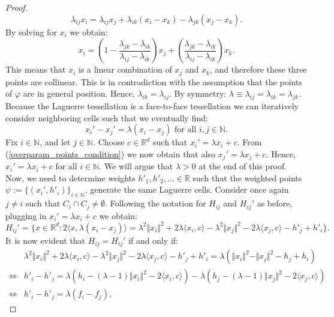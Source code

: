 \documentclass{article}
\newcommand{\NN}{\mathbb{N}}
\newcommand{\RR}{\mathbb{R}}
\theoremstyle{plain}
\theoremstyle{remark}
\theoremstyle{definition}
\begin{document}
\begin{proof}
    \[\lambda_{ij}x_i = \lambda_{ij}x_j + \lambda_{ik}(x_i - x_k) - \lambda_{jk}(x_j - x_k).\]
    By solving for $x_i$ we obtain:
    \[x_i = \left(1 - \frac{\lambda_{jk} - \lambda_{ik}}{\lambda_{ij} - \lambda_{ik}}\right)x_j + \left( \frac{\lambda_{jk} - \lambda_{ik}}{\lambda_{ij} - \lambda_{ik}}\right)x_k.\]
    This means that $x_i$ is a linear combination of $x_j$ and $x_k$, and therefore these three points are collinear. This is in contradiction with the assumption that the points of $\varphi$ are in general position. Hence, $\lambda_{ik} = \lambda_{ij}$. By symmetry: $\lambda \equiv \lambda_{ij} = \lambda_{ik} = \lambda_{jk}$. Because the Laguerre tessellation is a face-to-face tessellation we can iteratively consider neighboring cells such that we eventually find:
    \begin{equation}
        x_i' - x_j' = \lambda(x_i - x_j) \text{  for all } i,j \in \NN. \label{overparam_points_condition}
    \end{equation}
    Fix $i \in \NN$, and let $j \in \NN$. Choose $c \in \RR^d$ such that $x_i' = \lambda x_i + c$. From (\ref{overparam_points_condition}) we now obtain that also $x_j' = \lambda x_j + c$. Hence, $x_i' = \lambda x_i + c$ for all $i \in \NN$. We will argue that $\lambda > 0$ at the end of this proof. Now, we need to determine weights $h'_1, h'_2,\dots \in \RR$ such that the weighted points $\psi := \{(x_i',h'_i)\}_{i \in \NN}$. generate the same Laguerre cells. Consider once again $j\neq i$ such that $C_i \cap C_j \neq \emptyset$. Following the notation for $H_{ij}$ and $H_{ij}'$ as before, plugging in $x_i' = \lambda x_i + c$ we obtain:
    \[H_{ij}' = \{x \in \RR^d: 2 \langle x, \lambda(x_i - x_j)\rangle = \lambda^2 \Vert x_i \Vert^2 + 2\lambda \langle x_i, c\rangle - \lambda^2 \Vert x_j \Vert^2 - 2\lambda \langle x_j, c\rangle - h'_j + h'_i\}.\]
    It is now evident that $H_{ij} = H_{ij}'$ if and only if:
    \begin{align}
         & \lambda^2 \Vert x_i \Vert^2 + 2\lambda \langle x_i, c\rangle - \lambda^2 \Vert x_j \Vert^2 - 2\lambda \langle x_j, c\rangle - h'_j + h'_i = \lambda\left(\Vert x_i\Vert^2 - \Vert x_j\Vert^2 - h_j + h_i \right) \nonumber\\
        \iff& h'_i - h'_j = \lambda\left(h_i - (\lambda - 1)\Vert x_i \Vert^2 - 2\langle x_i,c\rangle \right) - \lambda\left(h_j - (\lambda - 1)\Vert x_j \Vert^2 - 2\langle x_j,c\rangle \right) \nonumber\\
        \iff& h'_i - h'_j = \lambda(f_i - f_j), \label{overparam_weights_condition}
    \end{align}

\end{proof}
\end{document}
